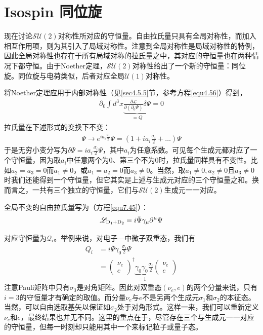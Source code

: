 \section[同位旋]{Isospin \quad 同位旋}\label{sec7.7}
现在讨论$\mathcal{SU}(2)$对称性所对应的守恒量。自由拉氏量只具有全局对称性，而加入相互作用项，则为其引入了局域对称性。注意到全局对称性是局域对称性的特例，因此全局对称性也存在于所有局域对称的拉氏量之中，其对应的守恒量也在两种情况下都守恒。由于Noether定理，$\mathcal{SU}(2)$对称性给出了一个新的守恒量：同位旋。同位旋与电荷类似，后者对应全局$\mathcal{U}(1)$对称性。

将Noether定理应用于内部对称性（见\ref{sec4.5.5}节，参考方程\ref{equ4.56}）得到，
\begin{align}
\partial_0\int{d^3x\underbrace{\frac{\partial\mathscr{L}}{\partial(\partial_0\Psi)}\delta\Psi}_{=Q}}=0
\label{equ7.131}
\end{align}
拉氏量在下述形式的变换下不变：
\begin{align}
\Psi\rightarrow e^{ia_i\frac{\sigma_i}{2}}\Psi=(1+ia_i\frac{\sigma_i}{2}+\ldots)\Psi
\label{equ7.132}
\end{align}
于是无穷小变分写为$\delta\Psi=ia_i\frac{\sigma_i}{2}  \Psi$，其中$a_i$为任意系数。可见每个生成元都对应了一个守恒量，因为取$a_i$中任意两个为0、第三个不为0时，拉氏量同样具有不变性。比如$a_2=a_3=0$而$a_1\ne0$，或$a_1=a_2=0$而$a_3\ne0$。当然，取$a_1\ne0,a_2\ne0$且$a_3\ne0$时我们还能得到一个守恒量，但它其实是上述与生成元对应的三个守恒量之和。换而言之，一共有三个独立的守恒量，它们与$\mathcal{SU}(2)$生成元一一对应。

全局不变的自由拉氏量写为（方程\ref{equ7.45}）：
\begin{align*}
\mathscr{L}_\text{D\textsubscript{1}+D\textsubscript{2}}=i\bar{\Psi}\gamma_\mu\partial^\mu\Psi
\end{align*}

对应守恒量为$\mathcal{Q}_i$。举例来说，对电子—中微子双重态，我们有
\begin{align}
Q_i&=i\bar{\Psi}\gamma_0\frac{\sigma_i}{2}\Psi\nonumber\\
&=\begin{pmatrix}\nu_e \\ e\end{pmatrix}^\dag\underbrace{\gamma_0\gamma_0}_{=1}\frac{\sigma_i}{2}\begin{pmatrix}\nu_e \\ e\end{pmatrix}
\label{equ7.133}
\end{align}
注意Pauli矩阵中只有$\sigma_3$是对角矩阵。因此对双重态$(\nu_e, e)$的两个分量来说，只有$i=3$的守恒量才有确定的取值。而分量$\nu_e$与$e$不是另两个生成元$\sigma_1$和$\sigma_2$的本征态。当然，可以自由选取基矢以保证如$\sigma_2$处于对角形式。这样一来，我们可以重新定义$\nu_e$和$e$，最终结果也并无不同。这里的重点在于，尽管存在三个与生成元一一对应的守恒量，但每一时刻却只能用其中一个来标记粒子或量子态。

